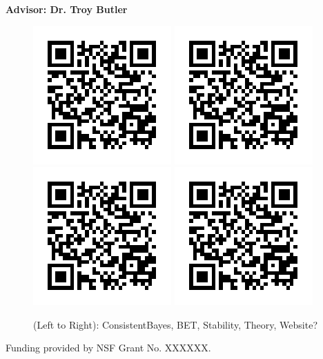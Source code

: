   \begin{block}{}
    \centering
    \textbf{Advisor: Dr. Troy Butler}
    \begin{figure}
        \includegraphics{ref1}
        \includegraphics{ref1}
        \includegraphics{ref1}
        \includegraphics{ref1}
    \caption{(Left to Right): ConsistentBayes, BET, Stability, Theory, Website?}
    \end{figure}
   

  Funding provided by NSF Grant No. XXXXXX. 
  

  \end{block}

